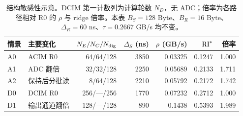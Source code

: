 \begin{table}[htbp]\centering\small
\begin{tabular}{@{}llrrrrr@{}}\toprule
情景 & 主要变化 & $N_E/N_C/N_{\rm dig}$ & $\Delta_S$ (ns) & $\rho$ (GB/s) & $\mathrm{RI}^*$ & 倍率\\\midrule
A0 & ACIM R0 & 64/64/128 & 3850 & 0.03325 & 0.1247 & 1.000\\
A1 & ADC 翻倍 & 32/32/128 & 2250 & 0.05689 & 0.2133 & 1.711\\
A2 & 保持后分批读 & 8/64/128 & 2210 & 0.05792 & 0.2172 & 1.742\\
D0 & DCIM R0 & 256/---/256 & 1770 & 0.07232 & 0.2712 & 1.000\\
D1 & 输出通道翻倍 & 128/---/128 & 890 & 0.1438 & 0.5393 & 1.989\\
\bottomrule\end{tabular}
\caption{结构敏感性示意。DCIM 第一计数列为计算轮数 $N_D$，无 ADC；倍率为各路径相对 R0 的 $\rho$ 与 ridge 倍率。本表 $B_S=128$ Byte、$B_R=16$ Byte、$\Delta_R=60$ ns、$\tau=0.2667$ GB/s 均不变。}
\label{tab:sensitivity}\end{table}
